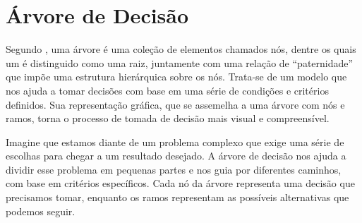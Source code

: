\documentclass[12pt,oneside,a4paper,chapter=TITLE,
			   english,brazil]{abntex2}
\begin{document}














\vspace{\onelineskip}


 
 \section{Árvore de Decisão}
\vspace{\onelineskip}

 Segundo , uma árvore é uma coleção de elementos chamados nós, dentre os quais um é distinguido como uma
raiz, juntamente com uma relação de “paternidade” que impõe uma estrutura hierárquica sobre os
nós. Trata-se de um modelo que nos ajuda a tomar decisões com base em uma série de condições e critérios definidos. Sua representação gráfica, que se assemelha a uma árvore com nós e ramos, torna o processo de tomada de decisão mais visual e compreensível.    


Imagine que estamos diante de um problema complexo que exige uma série de escolhas para chegar a um resultado desejado. A árvore de decisão nos ajuda a dividir esse problema em pequenas partes e nos guia por diferentes caminhos, com base em critérios específicos. Cada nó da árvore representa uma decisão que precisamos tomar, enquanto os ramos representam as possíveis alternativas que podemos seguir.
\end{document}
